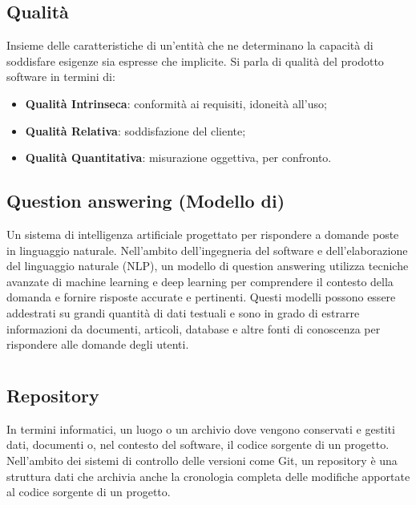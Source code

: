 \hypertarget{sec:Qualità}{}
\subsection*{Qualità}
Insieme delle caratteristiche di un’entità che ne determinano la capacità di soddisfare esigenze sia espresse che implicite. Si parla di qualità del prodotto software in termini di:
\begin{itemize}
    \item \textbf{Qualità Intrinseca}: conformità ai requisiti, idoneità all’uso;
    \item \textbf{Qualità Relativa}: soddisfazione del cliente;
    \item \textbf{Qualità Quantitativa}: misurazione oggettiva, per confronto.
\end{itemize}

\hypertarget{sec:question_answering}{}
\subsection*{Question answering (Modello di)}
Un sistema di intelligenza artificiale progettato per rispondere a domande poste in linguaggio naturale. Nell'ambito dell'ingegneria 
del software e dell'elaborazione del linguaggio naturale (NLP), un modello di question answering utilizza tecniche avanzate di 
machine learning e deep learning per comprendere il contesto della domanda e fornire risposte accurate e pertinenti. Questi modelli 
possono essere addestrati su grandi quantità di dati testuali e sono in grado di estrarre informazioni da documenti, articoli, 
database e altre fonti di conoscenza per rispondere alle domande degli utenti.


\newpage



\section{}

\subsection*{Repository}
In termini informatici, un luogo o un archivio dove vengono conservati e gestiti dati, documenti o, nel contesto del software, il codice sorgente di un 
progetto. Nell'ambito dei sistemi di controllo delle versioni come Git, un repository è una struttura dati che archivia anche la cronologia completa delle 
modifiche apportate al codice sorgente di un progetto.


